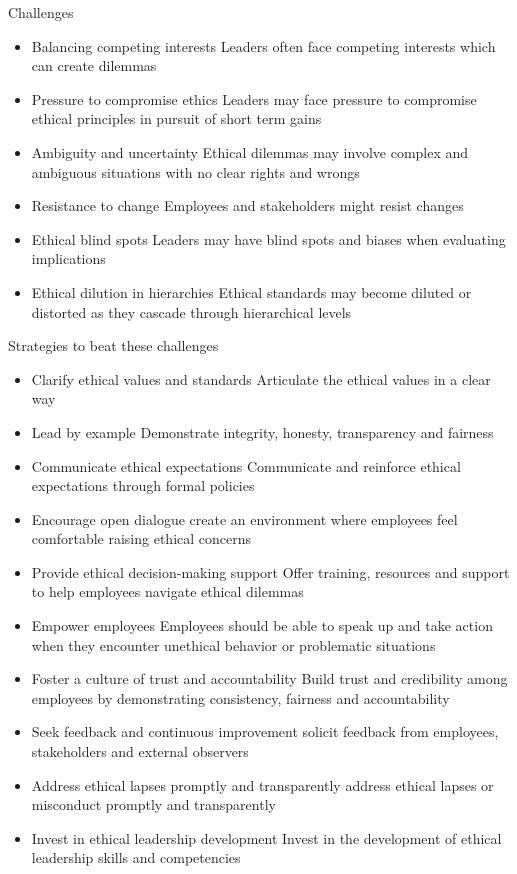 Challenges
\begin{itemize}
    \item Balancing competing interests \ra Leaders often face competing interests which can create dilemmas
    \item Pressure to compromise ethics \ra Leaders may face pressure to compromise ethical principles in pursuit of short term gains
    \item Ambiguity and uncertainty \ra Ethical dilemmas may involve complex and ambiguous situations with no clear rights and wrongs
    \item Resistance to change \ra Employees and stakeholders might resist changes
    \item Ethical blind spots \ra Leaders may have blind spots and biases when evaluating implications
    \item Ethical dilution in hierarchies \ra Ethical standards may become diluted or distorted as they cascade through hierarchical levels
\end{itemize}

Strategies to beat these challenges
\begin{itemize}
    \item Clarify ethical values and standards \ra Articulate the ethical values in a clear way
    \item Lead by example \ra Demonstrate integrity, honesty, transparency and fairness
    \item Communicate ethical expectations \ra Communicate and reinforce ethical expectations through formal policies
    \item Encourage open dialogue \ra create an environment where employees feel comfortable raising ethical concerns
    \item Provide ethical decision-making support \ra Offer training, resources and support to help employees navigate ethical dilemmas
    \item Empower employees \ra Employees should be able to speak up and take action when they encounter unethical behavior or problematic situations
    \item Foster a culture of trust and accountability \ra Build trust and credibility among employees by demonstrating consistency, fairness and accountability
    \item Seek feedback and continuous improvement \ra solicit feedback from employees, stakeholders and external observers
    \item Address ethical lapses promptly and transparently \ra address ethical lapses or misconduct promptly and transparently
    \item Invest in ethical leadership development \ra Invest in the development of ethical leadership skills and competencies
\end{itemize}





















